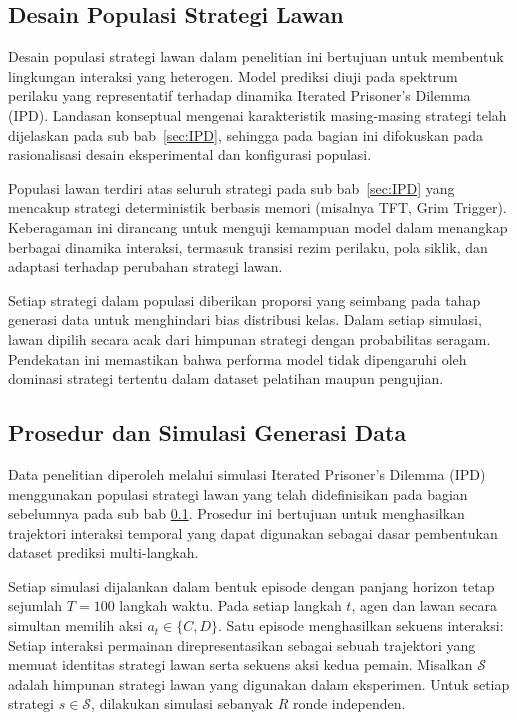 \subsection{Desain Populasi Strategi Lawan}\label{sec:PopulasiStrategi}

Desain populasi strategi lawan dalam penelitian ini bertujuan untuk membentuk lingkungan interaksi yang heterogen. Model prediksi diuji pada spektrum perilaku yang representatif terhadap dinamika Iterated Prisoner's Dilemma (IPD). Landasan konseptual mengenai karakteristik masing-masing strategi telah dijelaskan pada sub bab~\ref{sec:IPD}, sehingga pada bagian ini difokuskan pada rasionalisasi desain eksperimental dan konfigurasi populasi.

Populasi lawan terdiri atas seluruh strategi pada sub bab~\ref{sec:IPD} yang mencakup strategi deterministik berbasis memori (misalnya TFT, Grim Trigger). Keberagaman ini dirancang untuk menguji kemampuan model dalam menangkap berbagai dinamika interaksi, termasuk transisi rezim perilaku, pola siklik, dan adaptasi terhadap perubahan strategi lawan. 

Setiap strategi dalam populasi diberikan proporsi yang seimbang pada tahap generasi data untuk menghindari bias distribusi kelas. Dalam setiap simulasi, lawan dipilih secara acak dari himpunan strategi dengan probabilitas seragam. Pendekatan ini memastikan bahwa performa model tidak dipengaruhi oleh dominasi strategi tertentu dalam dataset pelatihan maupun pengujian.

\subsection{Prosedur dan Simulasi Generasi Data}

Data penelitian diperoleh melalui simulasi Iterated Prisoner's Dilemma (IPD) menggunakan populasi strategi lawan yang telah didefinisikan pada bagian sebelumnya pada sub bab \ref{sec:PopulasiStrategi}. Prosedur ini bertujuan untuk menghasilkan trajektori interaksi temporal yang dapat digunakan sebagai dasar pembentukan dataset prediksi multi-langkah.

Setiap simulasi dijalankan dalam bentuk episode dengan panjang horizon tetap sejumlah $T = 100$ langkah waktu. Pada setiap langkah $t$, agen dan lawan secara simultan memilih aksi $a_t \in \{C, D\}$. Satu episode menghasilkan sekuens interaksi:
Setiap interaksi permainan direpresentasikan sebagai sebuah trajektori
yang memuat identitas strategi lawan serta sekuens aksi kedua pemain.
Misalkan $\mathcal{S}$ adalah himpunan strategi lawan yang digunakan
dalam eksperimen. Untuk setiap strategi $s \in \mathcal{S}$,
dilakukan simulasi sebanyak $R$ ronde independen.

